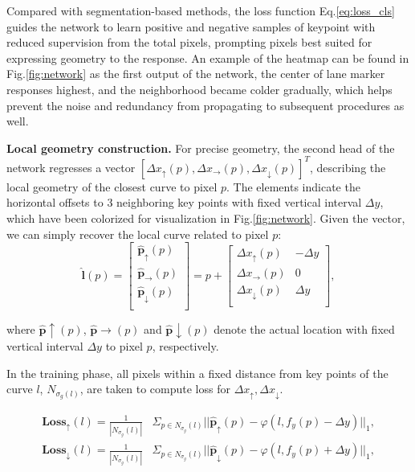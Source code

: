 \documentclass[final]{cvpr}
\begin{document}
Compared with segmentation-based methods, the loss function Eq.\ref{eq:loss_cls} guides the network to learn positive and negative samples of keypoint with reduced supervision from the total pixels, prompting pixels best suited for expressing geometry to the response. An example of the heatmap can be found in Fig.\ref{fig:network} as the first output of the network, the center of lane marker responses highest, and the neighborhood became colder gradually, which helps prevent the noise and redundancy from propagating to subsequent procedures as well.


\textbf{Local geometry construction.} For precise geometry, the second head of the network regresses a vector $[\Delta{x_{\uparrow}}(p), \Delta{x_{\rightarrow}}(p), \Delta{x_{\downarrow}}(p)]^T$, describing the local geometry of the closest curve to pixel $p$. The elements indicate the horizontal offsets to 3 neighboring key points with fixed vertical interval $\Delta y$, which have been colorized for visualization in Fig.\ref{fig:network}. Given the vector, we can simply recover the local curve related to pixel $p$:
\begin{equation}
	\bm{\hat{l}}(p)=
	\left[
	\begin{array}{ccc} 
		\bm{\hat{p}}_{\uparrow}(p) \\
		\bm{\hat{p}}_{\rightarrow}(p) \\
		\bm{\hat{p}}_{\downarrow}(p) \\
	\end{array}
	\right]
	= 
	p+
	\left[
	\begin{array}{ccc} 
		\Delta{x_{\uparrow}}(p)   & -\Delta y \\
		\Delta{x_{\rightarrow}}(p) & 0 \\
		\Delta{x_{\downarrow}}(p) & \Delta y \\
	\end{array}
	\right],
	\label{eq:local_curve}
\end{equation}

\noindent where $\bm{\hat{p}}{\uparrow}(p)$, $\bm{\hat{p}}{\rightarrow}(p)$ and $\bm{\hat{p}}{\downarrow}(p)$ denote the actual location with fixed vertical interval $\Delta y$ to pixel $p$, respectively.

In the training phase, all pixels within a fixed distance from key points of the curve $l$, $N_{\sigma_{g}(l)}$, are taken to compute loss for $\Delta{x_{\uparrow}}, \Delta{x_{\downarrow}}$.

\begin{equation}
	\begin{aligned}
		\bm{Loss_{\uparrow}}(l)=
		\frac{1}{|N_{\sigma_{g}}(l)|}&\Sigma_{p\in{N_{\sigma_{g}}(l)}}
		||\bm{\hat{p}}_{\uparrow}(p) - \varphi(l,f_{y}(p)-\Delta y)||_{1},\\
		\bm{Loss_{\downarrow}}(l)=
		\frac{1}{|N_{\sigma_{g}}(l)|}&\Sigma_{p\in{N_{\sigma_{g}}(l)}}
		||\bm{\hat{p}}_{\downarrow}(p)-  \varphi(l,f_{y}(p)+\Delta y)||_{1},
	\end{aligned}
	\label{eq:loss_updown}
\end{equation}
\end{document}
